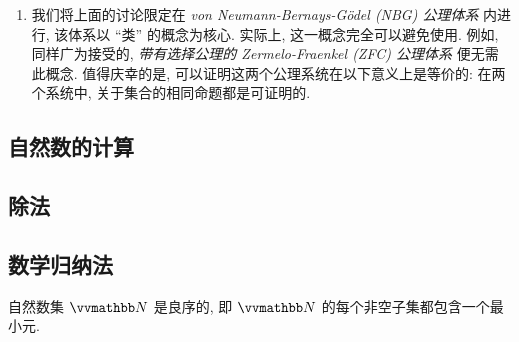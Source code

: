 \begin{remark}
\begin{enumerate}
        现在设 \((\N', 0', \nu')\) 是另一个自然数模型. 那么, 在集合论的框架内, 可以证明存在一个双射 \(\varphi \colon \N \to \N'\) 使得 \(\varphi(0) = 0'\) 且 \(\varphi \circ \nu = \nu' \circ \varphi\), 即 \(\varphi\) 是从 \((\N, 0, \nu)\) 到 \((\N', 0', \nu')\) 的同构. 因此, \textsl{自然数在同构意义下是唯一的.} 这样一来, 谈论自然数便是有意义的. 证明和细节可参见 [FP85].

        \item 我们将上面的讨论限定在 \textsl{von Neumann-Bernays-G\"odel (NBG) 公理体系} 内进行, 该体系以 ``类'' 的概念为核心. 实际上, 这一概念完全可以避免使用. 例如, 同样广为接受的, \textsl{带有选择公理的 Zermelo-Fraenkel (ZFC) 公理体系} 便无需此概念. 值得庆幸的是, 可以证明这两个公理系统在以下意义上是等价的: 在两个系统中, 关于集合的相同命题都是可证明的.
    \end{enumerate}
\end{remark}

\subsection{自然数的计算}

\begin{theorem}\label{thm:the-arithmetic-of-natural-numbers}
    
\end{theorem}

\subsection{除法}

\subsection{数学归纳法}

\begin{proposition}[良序原理]\label{prop:well-ordering-principle}
    自然数集 \(\N\) 是良序的, 即 \(\N\) 的每个非空子集都包含一个最小元.
\end{proposition}

\begin{proposition}[算术基本定理]
    
\end{proposition}

\begin{proposition}[数学归纳法]\label{prop:mathematical-induction}
    
\end{proposition}

